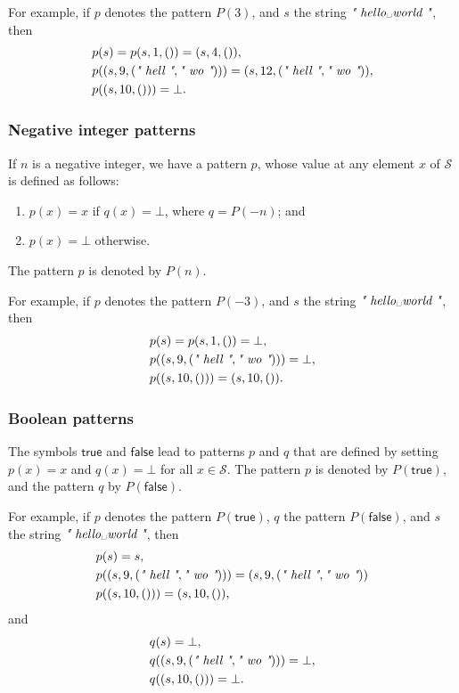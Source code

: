 \documentclass{article}
\begin{document}
For example, if \(p\) denotes the pattern \(P(3)\), and \(s\) the
string \(\text{\itshape" \text{hello␣world} "}\), then
\begin{align*}
  &p(s) = p(s, 1, ()) = (s, 4, ()), \\
  &p((s, 9, (\text{\itshape" hell "}, \text{\itshape" wo "}))) =
    (s, 12, (\text{\itshape" hell "}, \text{\itshape" wo "})), \\
  &p((s, 10, ())) = \bot.
\end{align*}

\subsubsection{Negative integer patterns}
\label{sec:upt2mdy9}

If \(n\) is a negative integer, we have a pattern \(p\), whose value
at any element \(x\) of \(\mathcal{S}\) is defined as follows:
\begin{enumerate}
\item \(p(x) = x\) if \(q(x) = \bot\), where \(q = P(-n)\); and
\item \(p(x) = \bot\) otherwise.
\end{enumerate}
The pattern \(p\) is denoted by \(P(n)\).

For example, if \(p\) denotes the pattern \(P(-3)\), and \(s\) the
string \(\text{\itshape" \text{hello␣world} "}\), then
\begin{align*}
  &p(s) = p(s, 1, ()) = \bot, \\
  &p((s, 9, (\text{\itshape" hell "}, \text{\itshape" wo "}))) = \bot, \\
  &p((s, 10, ())) = (s, 10, ()).
\end{align*}

\subsubsection{Boolean patterns}
\label{sec:kuf3y73z}

The symbols \(\mathsf{true}\) and \(\mathsf{false}\) lead to patterns
\(p\) and \(q\) that are defined by setting \(p(x) = x\) and
\(q(x) = \bot\) for all \(x \in \mathcal{S}\).  The pattern \(p\) is
denoted by \(P(\mathsf{true})\), and the pattern \(q\) by
\(P(\mathsf{false})\).

For example, if \(p\) denotes the pattern \(P(\mathsf{true})\), \(q\)
the pattern \(P(\mathsf{false})\), and \(s\) the string
\(\text{\itshape" \text{hello␣world} "}\), then
\begin{align*}
  &p(s) = s, \\
  &p((s, 9, (\text{\itshape" hell "}, \text{\itshape" wo "}))) =
    (s, 9, (\text{\itshape" hell "}, \text{\itshape" wo "})) \\
  &p((s, 10, ())) = (s, 10, ()),
\end{align*}
and
\begin{align*}
  &q(s) = \bot, \\
  &q((s, 9, (\text{\itshape" hell "}, \text{\itshape" wo "}))) = \bot, \\
  &q((s, 10, ())) = \bot.
\end{align*}
\end{document}
